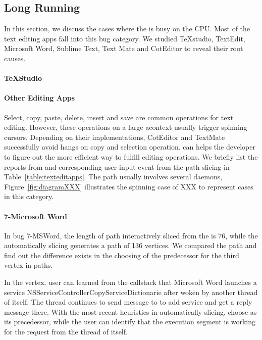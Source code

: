 \subsection{Long Running}

In this section, we discuss the cases where the \spinningnode is busy on the
CPU. Most of the text editing apps fall into this bug category. We studied
TeXstudio, TextEdit, Microsoft Word, Sublime Text, Text Mate and CotEditor to
reveal their root causes.

\paragraph{TeXStudio}


\paragraph{Other Editing Apps}

Select, copy, paste, delete, insert and save are common operations for text
editing. However, these operations on a large acontext usually trigger spinning
cursors. Depending on their implementations, CotEditor and TextMate successfully
avoid hangs on copy and selection operation. \xxx can helps the developer to
figure out the more efficient way to fulfill editing operations. We briefly list
the reports from \spinningnode and corresponding user input event from the path
slicing in Table~\ref{table:texteditapps}. The path usually involves several
daemons, Figure~\ref{fig:diagramXXX} illustrates the spinning case of XXX to
represent cases in this category.

\paragraph{7-Microsoft Word}

In bug 7-MSWord, the length of path interactively sliced from the \spinningnode
is 76, while the automatically slicing generates a path of 136 vertices. We
compared the path and find out the difference exists in the choosing of the
predecessor for the third vertex in paths.

In the vertex, user can learned from the callstack that Microsoft Word launches
a service NSServiceControllerCopyServiceDictionarie after woken by another
thread of itself. The thread continues to send message to  to add
service and get a reply message there. With the most recent heuristics in
automatically slicing, \xxx choose  as its precedessor, while the
user can identify that the execution segment is working for the request from the
thread of itself.

